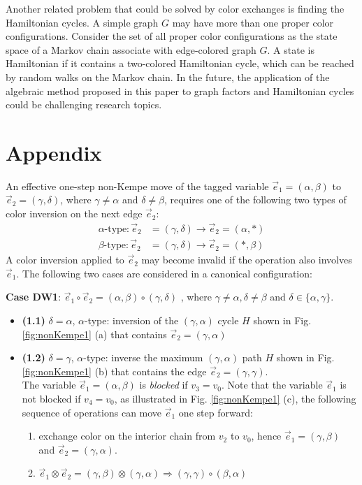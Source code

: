 \documentclass[11pt]{article}
\begin{document}
Another related problem that could be solved by color exchanges is finding the Hamiltonian cycles. A simple graph $G$ may have more than one proper color configurations. Consider the set of all proper color configurations as the state space of a Markov chain associate with edge-colored graph $G$. A state is Hamiltonian if it contains a two-colored Hamiltonian cycle, which can be reached by random walks on the Markov chain. In the future, the application of the algebraic method proposed in this paper to graph factors and Hamiltonian cycles could be challenging research topics.  






 

\section*{Appendix}

An effective one-step non-Kempe move of the tagged variable $\vec{e}_1=(\alpha,\beta)$  to $\vec{e}_2=(\gamma,\delta)$, where $\gamma \neq \alpha$ and $\delta \neq \beta$, requires one of the following two types of color inversion on the next edge $\vec{e}_2$: 
\begin{align}
\alpha \mbox{-type}: \vec{e}_2 & =(\gamma,\delta) \rightarrow \vec{e}_2=(\alpha,*) \nonumber \\ 
\beta \mbox{-type}: \vec{e}_2 & =(\gamma,\delta) \rightarrow \vec{e}_2=(*,\beta) \nonumber 
\end{align}
A color inversion applied to $\vec{e}_2$ may become invalid if the operation also involves $\vec{e}_1$. The following two cases are considered in a canonical configuration:

{\bf Case DW1}: $\vec{e}_1 \circ \vec{e}_2 =(\alpha,\beta) \circ (\gamma,\delta)$ , where $\gamma \neq \alpha , \delta \neq \beta$ and $\delta \in \{\alpha, \gamma \}$.
\begin{itemize}  
\itemsep -2pt \item {\bf (1.1)} $\delta=\alpha$, $\alpha$-type: inversion of the $(\gamma,\alpha)$ cycle $H$ shown in Fig. \ref{fig:nonKempe1} (a) that contains $\vec{e}_2=(\gamma,\alpha)$
\item {\bf (1.2)} $\delta = \gamma$, $\alpha$-type: inverse the maximum $(\gamma,\alpha)$ path $H$ shown in Fig. \ref{fig:nonKempe1} (b) that contains the edge $\vec{e}_2=(\gamma,\gamma)$.\\
The variable $\vec{e}_1=(\alpha,\beta)$ is {\it blocked} if $v_3=v_0$. Note that the variable $\vec{e}_1$  is not blocked if $v_4=v_0$, as illustrated in Fig. \ref{fig:nonKempe1} (c), the following sequence of operations can move $\vec{e}_1$ one step forward:
\begin{enumerate}
\itemsep -2pt \item exchange color on the interior chain from $v_2$ to $v_0$, hence $\vec{e}_1=(\gamma,\beta)$ and $\vec{e}_2=(\gamma,\alpha)$.
\item $\vec{e}_1 \otimes \vec{e}_2 = (\gamma,\beta) \otimes (\gamma,\alpha) \Rightarrow (\gamma,\gamma) \circ (\beta,\alpha)$
\end{enumerate}
\end{itemize}
\end{document}
